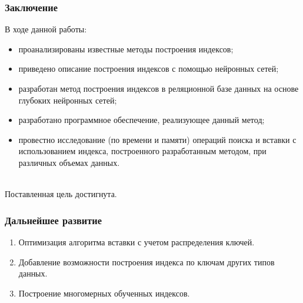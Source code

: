 \documentclass[8pt,table]{bmstu-pr}
\begin{document}
\begin{frame}
    \fontsize{22pt}{22pt}\selectfont
    \frametitle{Заключение}
    В ходе данной работы:
    \begin{itemize}
        \item проанализированы известные методы построения индексов;
        \item приведено описание построения индексов с помощью нейронных сетей;
        \item разработан метод построения индексов в реляционной базе
            данных на основе глубоких нейронных сетей;
        \item разработано программное обеспечение, реализующее данный метод;
        \item провестно исследование (по времени и памяти) операций поиска и
            вставки с использованием индекса, построенного разработанным
            методом, при различных объемах данных.
    \end{itemize}
    ~\\

    Поставленная цель достигнута.
\end{frame}

\begin{frame}
    \fontsize{22pt}{22pt}\selectfont
    \frametitle{Дальнейшее развитие}
    \begin{enumerate}
        \item Оптимизация алгоритма вставки с учетом распределения ключей.
        \item Добавление возможности построения индекса по ключам других типов
            данных.
        \item  Построение многомерных обученных индексов.
    \end{enumerate}
    ~\\
\end{frame}
\end{document}
